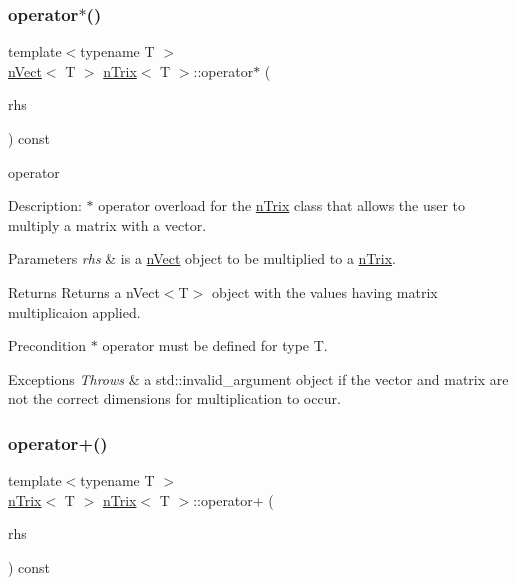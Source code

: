\subsubsection{\texorpdfstring{operator$\ast$()}{operator*()}\hspace{0.1cm}{\footnotesize\ttfamily [2/2]}}
{\footnotesize\ttfamily template$<$typename T $>$ \\
\hyperlink{classnVect}{n\+Vect}$<$ T $>$ \hyperlink{classnTrix}{n\+Trix}$<$ T $>$\+::operator$\ast$ (\begin{DoxyParamCaption}\item[{const \hyperlink{classnVect}{n\+Vect}$<$ T $>$ \&}]{rhs }\end{DoxyParamCaption}) const}




\begin{DoxyItemize}
\item operator 
\end{DoxyItemize}

Description\+: $\ast$ operator overload for the \hyperlink{classnTrix}{n\+Trix} class that allows the user to multiply a matrix with a vector. 
\begin{DoxyParams}{Parameters}
{\em rhs} & is a \hyperlink{classnVect}{n\+Vect} object to be multiplied to a \hyperlink{classnTrix}{n\+Trix}. \\
\hline
\end{DoxyParams}
\begin{DoxyReturn}{Returns}
Returns a n\+Vect$<$\+T$>$ object with the values having matrix multiplicaion applied. 
\end{DoxyReturn}
\begin{DoxyPrecond}{Precondition}
$\ast$ operator must be defined for type T. 
\end{DoxyPrecond}

\begin{DoxyExceptions}{Exceptions}
{\em Throws} & a std\+::invalid\+\_\+argument object if the vector and matrix are not the correct dimensions for multiplication to occur. \\
\hline
\end{DoxyExceptions}
\mbox{\label{classnTrix_aacf51597babef6c97ba7101066f84157}} 
\subsubsection{\texorpdfstring{operator+()}{operator+()}}
{\footnotesize\ttfamily template$<$typename T $>$ \\
\hyperlink{classnTrix}{n\+Trix}$<$ T $>$ \hyperlink{classnTrix}{n\+Trix}$<$ T $>$\+::operator+ (\begin{DoxyParamCaption}\item[{const \hyperlink{classnTrix}{n\+Trix}$<$ T $>$ \&}]{rhs }\end{DoxyParamCaption}) const}




